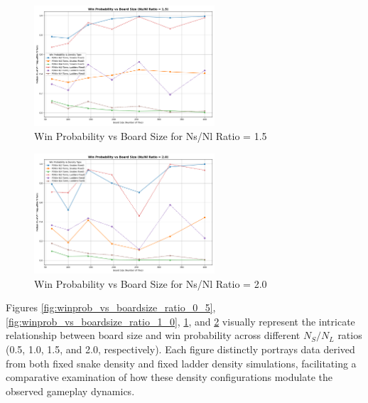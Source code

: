 \begin{figure}[ht]
	\centering
	\includegraphics[width=0.6\textwidth]{"../Chapter 4/Latest/plots_output/WinProbVsBoardSize_ByRatio/WinProbVsBoardSize_ByRatio_ns_nl_ratio-1_5"}
	\caption{Win Probability vs Board Size for Ns/Nl Ratio = 1.5}
	\label{fig:winprob_vs_boardsize_ratio_1_5}
\end{figure}

\begin{figure}[ht]
	\centering
	\includegraphics[width=0.6\textwidth]{"../Chapter 4/Latest/plots_output/WinProbVsBoardSize_ByRatio/WinProbVsBoardSize_ByRatio_ns_nl_ratio-2_0"}
	\caption{Win Probability vs Board Size for Ns/Nl Ratio = 2.0}
	\label{fig:winprob_vs_boardsize_ratio_2_0}
\end{figure}


Figures \ref{fig:winprob_vs_boardsize_ratio_0_5}, \ref{fig:winprob_vs_boardsize_ratio_1_0}, \ref{fig:winprob_vs_boardsize_ratio_1_5}, and \ref{fig:winprob_vs_boardsize_ratio_2_0} visually represent the intricate relationship between board size and win probability across different $N_S/N_L$ ratios (0.5, 1.0, 1.5, and 2.0, respectively). Each figure distinctly portrays data derived from both fixed snake density and fixed ladder density simulations, facilitating a comparative examination of how these density configurations modulate the observed gameplay dynamics.


